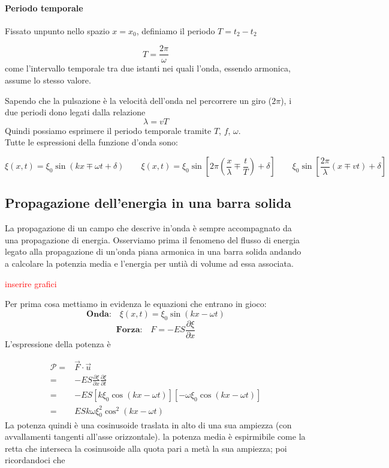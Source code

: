 \documentclass[x11names]{report}
\begin{document}
	\paragraph{Periodo temporale} Fissato unpunto nello spazio \(x=x_0\), definiamo il periodo \(T = t_2-t_2\)
	
	\[ T = \frac{2\pi}{\omega}\] 
	come l'intervallo temporale tra due istanti nei quali l'onda, essendo armonica, assume lo stesso valore.
	
	Sapendo che la pulsazione è la velocità dell'onda nel percorrere un giro (\(2\pi\)), i due periodi dono legati dalla relazione
	\[ 
	\lambda = vT
	\]
	Quindi possiamo esprimere il periodo temporale tramite \(T\), \(f\), \(\omega\).\\
	
	\noindent
	Tutte le espressioni della funzione d'onda sono:
	
	\[ 
	\xi(x,t) = \xi_0 \sin\left(kx \mp \omega t + \delta\right) \qquad \xi(x,t) = \xi_0 \sin\left[ 2\pi\left(\frac{x}{\lambda} \mp \frac{t}{T}\right) + \delta\right]  \qquad \xi_0\sin\left[\frac{2\pi}{\lambda}\left(x \mp vt\right) + \delta \right]
	\]
	
	
	\newpage
	\subsection{Propagazione dell'energia in una barra solida}
	La propagazione di un campo che descrive in'onda è sempre accompagnato da una propagazione di energia. Osserviamo prima il fenomeno del flusso di energia legato alla propagazione di un'onda piana armonica in una barra solida andando a calcolare la potenzia media e l'energia per untià di volume ad essa associata.\\
	
	\begin{center}
		\textcolor{red}{inserire grafici}
	\end{center}
	
	\noindent
	Per prima cosa mettiamo in evidenza le equazioni che entrano in gioco:
	\[ 
	\textbf{Onda:} \quad \xi(x,t) = \xi_0\sin\left(kx - \omega t\right)
	\]
	\[ 
	\textbf{Forza:} \quad F = -ES\frac{\partial\xi}{\partial x}
	\]
	L'espressione della potenza è 
	
	\begin{align*}
		\mathcal{P} =& \vec{F} \cdot \vec{u} \\
		=& -ES\frac{\partial\xi}{\partial x}\frac{\partial\xi}{\partial t} \\
		=& -ES\left[k\xi_0\cos\left(kx -\omega t\right)\right]\left[-\omega \xi_0\cos\left(kx -\omega t\right)\right] \\
		=& ESk\omega \xi_0^2\cos^2\left(kx-\omega t\right)
	\end{align*}
	La potenza quindi è una cosinusoide traslata in alto di una sua ampiezza (con avvallamenti tangenti all'asse orizzontale). la potenza media è espirmibile come la retta che interseca la cosinusoide alla quota pari a metà la sua ampiezza; poi ricordandoci che
	
\end{document}
